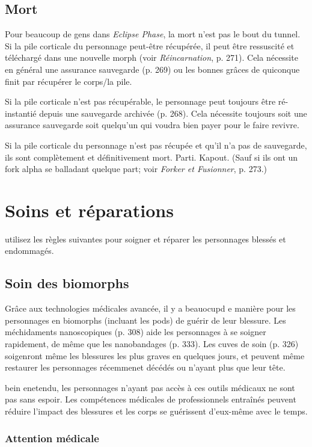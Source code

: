 \subsection{Mort} Pour beaucoup de gens dans \emph{Eclipse Phase}, la mort n'est pas le bout du tunnel. Si la pile corticale du personnage peut-être récupérée, il peut être ressuscité et téléchargé dans une nouvelle morph (voir \emph{Réincarnation}, p. 271). Cela nécessite en général une assurance sauvegarde (p. 269) ou les bonnes grâces de quiconque finit par récupérer le corps/la pile. 

Si la pile corticale n'est pas récupérable, le personnage peut toujours être ré-instantié depuis une sauvegarde archivée (p. 268). Cela nécessite toujours soit une assurance sauvegarde soit quelqu'un qui voudra bien payer pour le faire revivre. 

Si la pile corticale du personnage n'est pas récupée et qu'il n'a pas de sauvegarde, ils sont complètement et définitivement mort. Parti. Kapout. (Sauf si ils ont un fork alpha se balladant quelque part; voir \emph{Forker et Fusionner}, p. 273.) 

\section{Soins et réparations} \label{sec:healing-repair} 

utilisez les règles suivantes pour soigner et réparer les personnages blessés et endommagés. 

\subsection{Soin des biomorphs} 

Grâce aux technologies médicales avancée, il y a beauocupd e manière pour les personnages en biomorphs (incluant les pods) de guérir de leur blessure. Les méchidaments nanoscopiques (p. 308) aide les personnages à se soigner rapidement, de même que les nanobandages (p. 333). Les cuves de soin (p. 326) soigenront même les blessures les plus graves en quelques jours, et peuvent même restaurer les personnages récemmenet décédés ou n'ayant plus que leur tête. 

bein enetendu, les personnages n'ayant pas accès à ces outils médicaux ne sont pas sans espoir. Les compétences médicales de professionnels entraînés peuvent réduire l'impact des blessures et les corps se guérissent d'eux-même avec le temps. 

\subsubsection{Attention médicale} 

